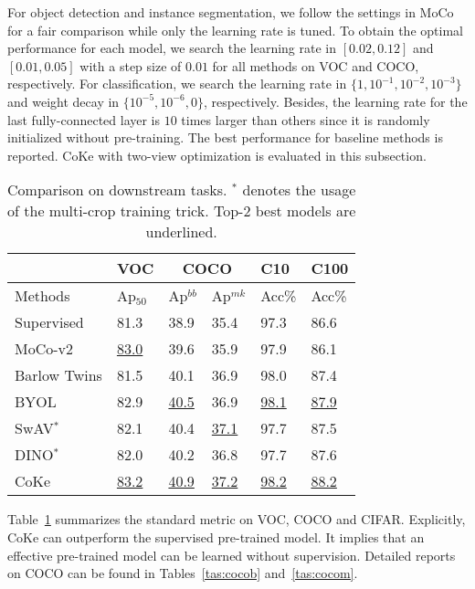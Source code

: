 \documentclass[10pt,twocolumn,letterpaper]{article}
\begin{document}
For object detection and instance segmentation, we follow the settings in MoCo~\cite{He0WXG20} for a fair comparison while only the learning rate is tuned. To obtain the optimal performance for each model, we search the learning rate in $[0.02,0.12]$ and $[0.01, 0.05]$ with a step size of $0.01$ for all methods on VOC and COCO, respectively. For classification, we search the learning rate in $\{1, 10^{-1}, 10^{-2}, 10^{-3}\}$ and weight decay in $\{10^{-5}, 10^{-6}, 0\}$, respectively. Besides, the learning rate for the last fully-connected layer is $10$ times larger than others since it is randomly initialized without pre-training. The best performance for baseline methods is reported. CoKe with two-view optimization is evaluated in this subsection.

\begin{table}[!ht]
\centering
\small
\begin{tabular}{|l|l|l|l|l|l|}\hline
&VOC&\multicolumn{2}{c|}{COCO}&C10&C100\\\hline
Methods&Ap$_{50}$&Ap$^{bb}$&Ap$^{mk}$&Acc\%&Acc\%\\\hline
Supervised&81.3&38.9&35.4 &97.3&86.6\\\hline
MoCo-v2&\underline{83.0}&39.6&35.9&97.9&86.1\\\hline
Barlow Twins&81.5&40.1&36.9&98.0&87.4 \\\hline
BYOL& 82.9&\underline{40.5}&36.9&\underline{98.1}&\underline{87.9}  \\\hline
SwAV$^*$&82.1&40.4&\underline{37.1}&97.7&87.5 \\\hline
DINO$^*$&82.0&40.2&36.8&97.7& 87.6\\\hline
CoKe&\underline{83.2}&\underline{40.9}&\underline{37.2}&\underline{98.2}&\underline{88.2}\\\hline
\end{tabular}
\caption{Comparison on downstream tasks. $^*$ denotes the usage of the multi-crop training trick. Top-2 best models are underlined.}\label{tas:ds}
\end{table}


Table~\ref{tas:ds} summarizes the standard metric on VOC, COCO and CIFAR. Explicitly, CoKe can outperform the supervised pre-trained model. It implies that an effective pre-trained model can be learned without supervision. Detailed reports on COCO can be found in Tables~\ref{tas:cocob} and~\ref{tas:cocom}.
\end{document}
